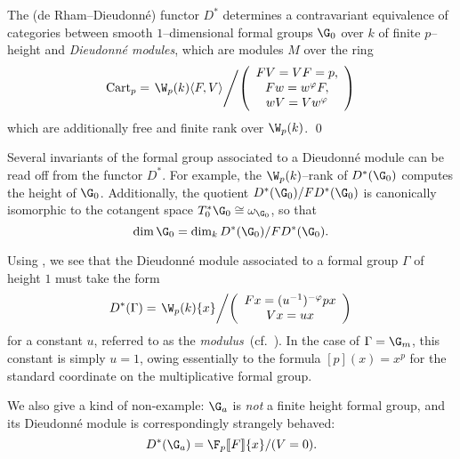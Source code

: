 \begin{theorem}\label{MainContraDieudonneThm}
The (de Rham--Dieudonn\'e) functor \(D^*\) determines a contravariant equivalence of categories between smooth \(1\)--dimensional formal groups \(\G_0\) over \(k\) of finite \(p\)--height and \textit{Dieudonn\'e modules}, which are modules \(M\) over the ring \[\Cart_p = \left. \W_p(k)\<F,V\> \middle/ \left( \begin{array}{c} FV = VF = p, \\ Fw = w^\phi F, \\ wV = Vw^\phi \end{array} \right) \right.\] which are additionally free and finite rank over \(\W_p(k)\). \qed
\end{theorem}

\begin{remark}\label{InvariantsFromDModule}
Several invariants of the formal group associated to a Dieudonn\'e module can be read off from the functor \(D^*\).  For example, the \(\W_p(k)\)--rank of \(D^*(\G_0)\) computes the height of \(\G_0\).  Additionally, the quotient \(D^*(\G_0) / FD^*(\G_0)\) is canonically isomorphic to the cotangent space \(T_0^* \G_0 \cong \omega_{\G_0}\), so that \[\dim \G_0 = \dim_k D^*(\G_0) / FD^*(\G_0).\]
\end{remark}

\begin{example}
Using , we see that the Dieudonn\'e module associated to a formal group \(\Gamma\) of height \(1\) must take the form \[D^*(\Gamma) = \left. \W_p(k)\{x\} \middle/ \left( \begin{array}{c} Fx = (u^{-1})^{-\phi}px \\ Vx = ux \end{array} \right)\right.\] for a constant \(u\), referred to as the \textit{modulus}~(cf.\ \cite[Theorem 4.2.2]{MoravaFormsOfKthy}).  In the case of \(\Gamma = \G_m\), this constant is simply \(u = 1\), owing essentially to the formula \([p](x) = x^p\) for the standard coordinate on the multiplicative formal group.
\end{example}

\begin{example}
We also give a kind of non-example: \(\G_a\) is \emph{not} a finite height formal group, and its Dieudonn\'e module is correspondingly strangely behaved: \[D^*(\G_a) = \F_p\ps{F}\{x\} / (V = 0).\]
\end{example}

